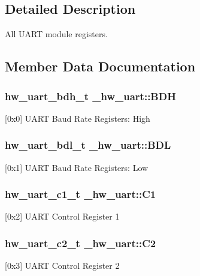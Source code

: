 \subsection{Detailed Description}
All U\+A\+RT module registers. 

\subsection{Member Data Documentation}
\subsubsection[{\texorpdfstring{B\+DH}{BDH}}]{ {\bf hw\+\_\+uart\+\_\+bdh\+\_\+t} \+\_\+hw\+\_\+uart\+::\+B\+DH}\hypertarget{struct__hw__uart_a6b8f1f538980c351669830d1a94a8adc}{}\label{struct__hw__uart_a6b8f1f538980c351669830d1a94a8adc}
\mbox{[}0x0\mbox{]} U\+A\+RT Baud Rate Registers\+: High 
\subsubsection[{\texorpdfstring{B\+DL}{BDL}}]{ {\bf hw\+\_\+uart\+\_\+bdl\+\_\+t} \+\_\+hw\+\_\+uart\+::\+B\+DL}\hypertarget{struct__hw__uart_a37ab6a62b7efb8ccc1cd6e281f80c0b9}{}\label{struct__hw__uart_a37ab6a62b7efb8ccc1cd6e281f80c0b9}
\mbox{[}0x1\mbox{]} U\+A\+RT Baud Rate Registers\+: Low 
\subsubsection[{\texorpdfstring{C1}{C1}}]{ {\bf hw\+\_\+uart\+\_\+c1\+\_\+t} \+\_\+hw\+\_\+uart\+::\+C1}\hypertarget{struct__hw__uart_a9bb2efd26bd629cc56abeec559cd9327}{}\label{struct__hw__uart_a9bb2efd26bd629cc56abeec559cd9327}
\mbox{[}0x2\mbox{]} U\+A\+RT Control Register 1 
\subsubsection[{\texorpdfstring{C2}{C2}}]{ {\bf hw\+\_\+uart\+\_\+c2\+\_\+t} \+\_\+hw\+\_\+uart\+::\+C2}\hypertarget{struct__hw__uart_a2eba8caa3f2d696bfe510c5c940e4158}{}\label{struct__hw__uart_a2eba8caa3f2d696bfe510c5c940e4158}
\mbox{[}0x3\mbox{]} U\+A\+RT Control Register 2 
